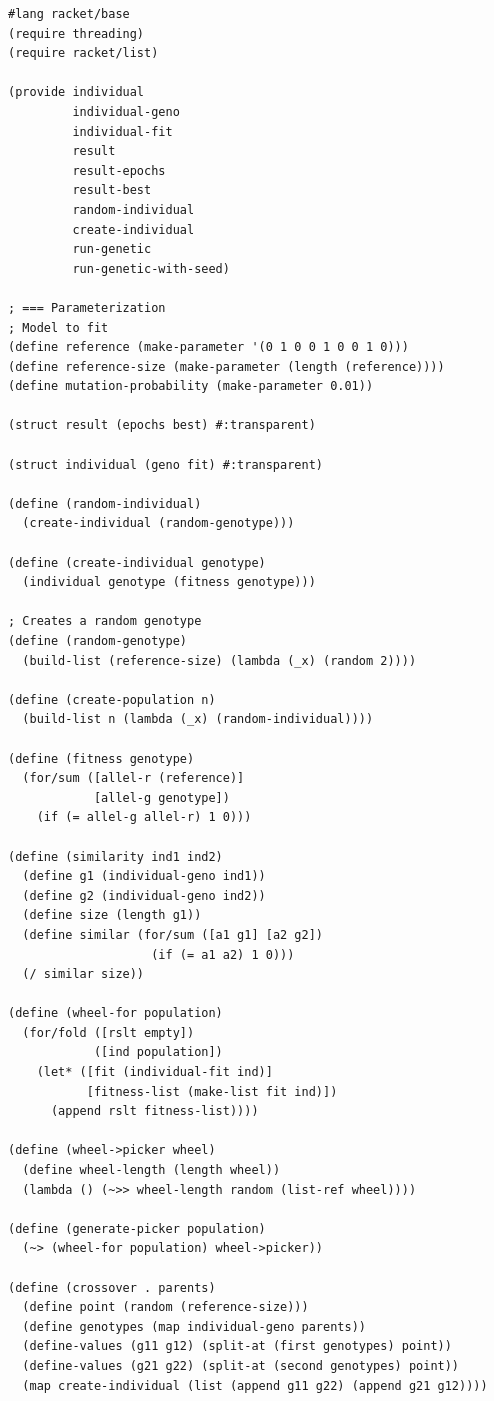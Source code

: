 \documentclass{llncs}
\begin{document}
\begin{lstlisting}
#lang racket/base
(require threading)
(require racket/list)

(provide individual
         individual-geno
         individual-fit
         result
         result-epochs
         result-best
         random-individual
         create-individual
         run-genetic
         run-genetic-with-seed)

; === Parameterization
; Model to fit
(define reference (make-parameter '(0 1 0 0 1 0 0 1 0)))
(define reference-size (make-parameter (length (reference))))
(define mutation-probability (make-parameter 0.01))

(struct result (epochs best) #:transparent)

(struct individual (geno fit) #:transparent)

(define (random-individual)
  (create-individual (random-genotype)))

(define (create-individual genotype)
  (individual genotype (fitness genotype)))

; Creates a random genotype
(define (random-genotype)
  (build-list (reference-size) (lambda (_x) (random 2))))

(define (create-population n)
  (build-list n (lambda (_x) (random-individual))))

(define (fitness genotype)
  (for/sum ([allel-r (reference)]
            [allel-g genotype])
    (if (= allel-g allel-r) 1 0)))

(define (similarity ind1 ind2)
  (define g1 (individual-geno ind1))
  (define g2 (individual-geno ind2))
  (define size (length g1))
  (define similar (for/sum ([a1 g1] [a2 g2])
                    (if (= a1 a2) 1 0)))
  (/ similar size))

(define (wheel-for population)
  (for/fold ([rslt empty])
            ([ind population])
    (let* ([fit (individual-fit ind)]
           [fitness-list (make-list fit ind)])
      (append rslt fitness-list))))

(define (wheel->picker wheel)
  (define wheel-length (length wheel))
  (lambda () (~>> wheel-length random (list-ref wheel))))

(define (generate-picker population)
  (~> (wheel-for population) wheel->picker))

(define (crossover . parents)
  (define point (random (reference-size)))
  (define genotypes (map individual-geno parents))
  (define-values (g11 g12) (split-at (first genotypes) point))
  (define-values (g21 g22) (split-at (second genotypes) point))
  (map create-individual (list (append g11 g22) (append g21 g12))))


\end{lstlisting}
\end{document}
